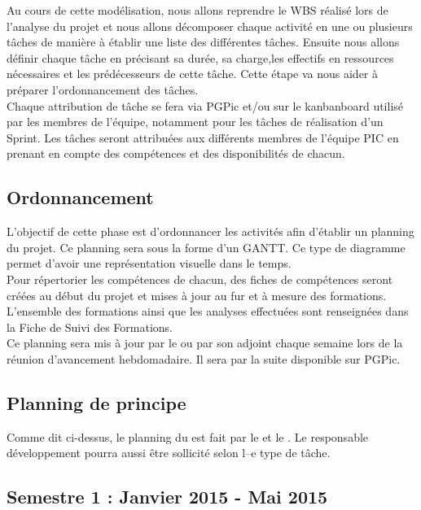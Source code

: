 Au cours de cette modélisation, nous allons reprendre le WBS réalisé lors de l’analyse du projet et nous allons décomposer chaque activité en une ou plusieurs tâches de manière à établir une liste des différentes tâches. Ensuite nous allons définir chaque tâche en précisant sa durée, sa charge,les effectifs en ressources nécessaires et les prédécesseurs de cette tâche. Cette étape va nous aider à préparer l’ordonnancement des tâches.\\

Chaque attribution de tâche se fera via PGPic et/ou sur le kanbanboard utilisé par les membres de l'équipe, notamment pour les tâches de réalisation d’un Sprint. Les tâches seront attribuées aux différents membres de l’équipe PIC en prenant en compte des compétences et des disponibilités de chacun.

\subsection{Ordonnancement}
\label{ordonnancement}

L'objectif de cette phase est d'ordonnancer les activités afin d'établir un planning du projet. Ce planning sera sous la forme d'un GANTT. Ce type de diagramme permet d’avoir une représentation visuelle dans le temps.\\

Pour répertorier les compétences de chacun, des fiches de compétences seront créées au début du projet et mises à jour au fur et à mesure des formations. L’ensemble des formations ainsi que les analyses effectuées sont renseignées dans la Fiche de Suivi des Formations.\\ 

Ce planning sera mis à jour par le \CP{} ou par son adjoint chaque semaine lors de la réunion d’avancement hebdomadaire. Il sera par la suite disponible sur PGPic.


\subsection{Planning de principe}
\label{planning_de_principe}

Comme dit ci-dessus, le planning du \PICCourt est fait par le \CP{} et le \CPA{}. Le responsable développement pourra aussi être sollicité selon l--e type de tâche.

\subsection*{Semestre 1 : Janvier 2015 - Mai 2015}


